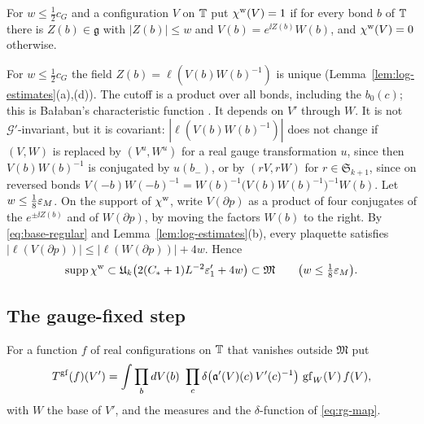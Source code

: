 \begin{definition}\label{def:chi-w}
For $w\le\frac12c_G$ and a configuration $V$ on $\mathbb T$ put $\chi^{\rm w}(V)=1$ if for every bond $b$ of $\mathbb T$ there is $Z(b)\in\mathfrak g$ with $|Z(b)|\le w$ and $V(b)=e^{\ii Z(b)}W(b)$, and $\chi^{\rm w}(V)=0$ otherwise.
\end{definition}

For $w\le\frac12c_G$ the field $Z(b)=\ell(V(b)W(b)^{-1})$ is unique (Lemma~\ref{lem:log-estimates}(a),(d)). The cutoff is a product over all bonds, including the $b_0(c)$; this is Ba\l aban's characteristic function \cite[(2.9)]{BalYM4I}. It depends on $V'$ through $W$. It is not $\mathcal G'$-invariant, but it is covariant: $|\ell(V(b)W(b)^{-1})|$ does not change if $(V,W)$ is replaced by $(V^u,W^u)$ for a real gauge transformation $u$, since then $V(b)W(b)^{-1}$ is conjugated by $u(b_-)$, or by $(rV,rW)$ for $r\in\mathfrak S_{k+1}$, since on reversed bonds $V(-b)W(-b)^{-1}=W(b)^{-1}\big(V(b)W(b)^{-1}\big)^{-1}W(b)$. Let $w\le\frac18\varepsilon_M$. On the support of $\chi^{\rm w}$, write $V(\partial p)$ as a product of four conjugates of the $e^{\pm\ii Z(b)}$ and of $W(\partial p)$, by moving the factors $W(b)$ to the right. By \eqref{eq:base-regular} and Lemma~\ref{lem:log-estimates}(b), every plaquette satisfies $|\ell(V(\partial p))|\le|\ell(W(\partial p))|+4w$. Hence
\begin{equation}\label{eq:chi-w-support}
\operatorname{supp}\chi^{\rm w}\subset\mathfrak U_k\big(2(C_*+1)L^{-2}\varepsilon'_1+4w\big)\subset\mathfrak M\qquad\big(w\le\tfrac18\varepsilon_M\big).
\end{equation}

\subsection{The gauge-fixed step}\label{ss:32.3}

\begin{definition}\label{def:gf-step}
For a function $f$ of real configurations on $\mathbb T$ that vanishes outside $\mathfrak M$ put
\[
T^{\rm gf}(f)(V')=\int\prod_bdV(b)\ \prod_c\delta\big(\mathfrak a'(V)(c)\,V'(c)^{-1}\big)\ \mathrm{gf}_W(V)\,f(V),
\]
with $W$ the base of $V'$, and the measures and the $\delta$-function of \eqref{eq:rg-map}.
\end{definition}

